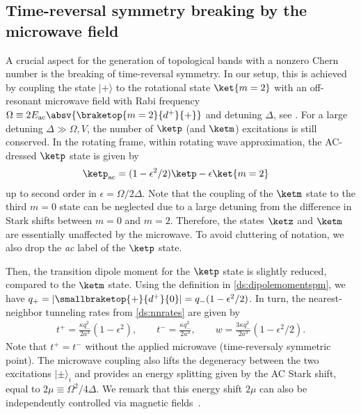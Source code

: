 \subsection{Time-reversal symmetry breaking by the microwave field}
A crucial aspect for the generation of topological bands with a nonzero Chern number is the breaking of time-reversal symmetry.
In our setup, this is achieved by coupling the state $|+\rangle$ to the rotational state $\ket{m=2}$ with an off-resonant microwave field with Rabi frequency $\Omega \equiv 2 E_\text{ac} \absv{\braketop{m=2}{d^+}{{+}}}$ and detuning $\Delta$, see .
For a large detuning $\Delta \gg \Omega, V$, the number of $\ketp$ (and $\ketm$) excitations is still conserved.
In the rotating frame, within rotating wave approximation, the AC-dressed $\ketp$ state is given by
\begin{align}
\ketp_\text{ac} &= (1-\epsilon^2/2)\ketp - \epsilon \ket{m=2}
\end{align}
up to second order in $\epsilon=\Omega/2\Delta$.
Note that the coupling of the $\ketm$ state to the third $m=0$ state can be neglected due to a large detuning from the difference in Stark shifts between $m=0$ and $m=2$.
Therefore, the states $\ketz$ and $\ketm$ are essentially unaffected by the microwave.
To avoid cluttering of notation, we also drop the \emph{ac} label of the $\ketp$ state.

Then, the transition dipole moment for the $\ketp$ state is slightly reduced, compared to the $\ketm$ state. Using the definition in \cref{ds:dipolemomentspm}, we have $q_+ = |\smallbraketop{+}{d^+}{0}|= q_- (1-\epsilon^2/2)$. In turn, the nearest-neighbor tunneling rates from \cref{ds:nnrates} are given by
\begin{align}
    t^+ = \frac{\kappa q_{-}^2}{2a^3} (1 - \epsilon^2),\qquad
    t^- = \frac{\kappa q_{-}^2}{2a^3},\qquad
    w = \frac{3 \kappa q_{-}^2}{2a^3} (1-\epsilon^2/2).
\end{align}
Note that $t^{+} = t^{-}$ without the applied microwave (time-reversaly symmetric point).
The microwave coupling also lifts the degeneracy between the two excitations $|\pm\rangle_{i}$ and provides an energy splitting given by the AC Stark shift, equal to $2\mu \equiv \Omega^2/4\Delta$.
We remark that this energy shift $2\mu$ can also be independently controlled via magnetic fields~\cite{Ospelkaus2010,Yan2013}.

